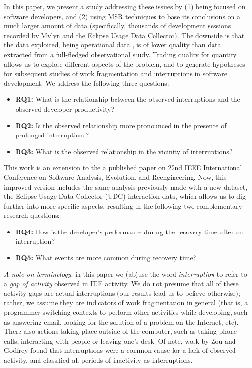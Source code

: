 \documentclass[times]{smrauth}
\begin{document}
In this paper, we present a study addressing these issues by (1) being focused on software developers, and (2) using MSR techniques to base its conclusions on a much larger amount of data (specifically, thousands of development sessions recorded by Mylyn and the Eclipse Usage Data Collector). The downside is that the data exploited, being operational data \cite{M14}, is of lower quality than data extracted from a full-fledged observational study. Trading quality for quantity allows us to explore different aspects of the problem, and to generate hypotheses for subsequent studies of work fragmentation and interruptions in software development. We address the following three questions:
\begin{itemize}
\item \textbf{RQ1:} What is the relationship between the observed interruptions and the observed developer productivity? 
\item \textbf{RQ2:} Is the observed relationship more pronounced in the presence of prolonged interruptions?
\item \textbf{RQ3:}  What is the observed relationship in the vicinity of interruptions?
\end{itemize}

This work is an extension to the a published paper on 22nd IEEE International Conference on Software Analysis, Evolution, and Reengineering. Now, this improved version includes the same analysis previously made with a new dataset, the Eclipse Usage Data Collector (UDC) interaction data, which allows us to dig further into more specific aspects, resulting in the following two complementary research questions:
\begin{itemize}
\item \textbf{RQ4:} How is the developer's performance during the recovery time after an interruption? 
\item \textbf{RQ5:} What events are more common during recovery time?
\end{itemize}

\emph{A note on terminology}: in this paper we (ab)use the word \emph{interruption} to refer to a \emph{gap of activity} observed in IDE activity. We do not presume that all of these activity gaps are actual interruptions (our results lead us to believe otherwise); rather, we assume they are indicators of work fragmentation in general (that is, a programmer switching contexts to perform other activities while developing, such as answering email, looking for the solution of a problem on the Internet, etc). 
There also actions taking place outside of the computer, such as taking phone calls, interacting with people or leaving one's desk. 
Of note, work by Zou and Godfrey \cite{ZG06} found that interruptions were a common cause for a lack of observed activity, and classified all periods of inactivity as interruptions. %
\end{document}
